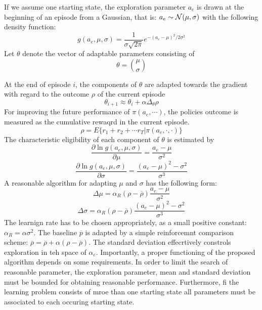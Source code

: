 \documentclass[10.5pt]{article}
\begin{document}
If we assume one starting state, the exploration parameter $a_e$ is drawn at the beginning of an episode from a Gaussian, that is: $a_e\sim {\cal N}(\mu, \sigma)$ with the following density function: 
\begin{equation}
g(a_e, \mu, \sigma) = \dfrac{1}{\sigma\sqrt{2\pi}}e^{-(a_e-\mu)^2/2\sigma^2}
\end{equation}
Let $\theta$ denote the vector of adaptable parameters consisting of
\begin{equation}
\theta = {\mu \choose \sigma}
\end{equation}

At the end of episode $i$, the components of $\theta$ are adapted towards the gradient with regard to the outcome $\rho$ of the current episode 
\begin{equation}
\theta_{i+1} \approx \theta_i +\alpha \Delta_\theta \rho
\end{equation}
For improving the future performance of $\pi(a_e, \cdots)$, the policies outcome is measured as the cumulative rewaqrd in the current episode. 
\begin{equation}
\rho = E\{r_1+r_2 + \cdots r_T|\pi (a_e, \cdot, \cdot)\}
\end{equation}
The characteristic eligibility of each component of $\theta$ is estimated by
\begin{equation}
\dfrac{\partial \ln g(a_e, \mu, \sigma)}{\partial \mu} = \dfrac{a_e-\mu}{\sigma^2}
\end{equation}
\begin{equation}
\dfrac{\partial \ln g(a_e, \mu, \sigma)}{\partial \sigma} = \dfrac{(a_e-\mu)^2-\sigma^2}{\sigma^3}
\end{equation}
A reasonable algorithm for adapting $\mu$ and $\sigma$ has the following form:
\begin{equation}
\Delta \mu = \alpha_R(\rho - \overline{\rho})\dfrac{a_e-\mu}{\sigma^2}
\end{equation}
\begin{equation}
\Delta \sigma = \alpha_R(\rho - \overline{\rho})\dfrac{(a_e-\mu)^2-\sigma^2}{\sigma^3}
\end{equation}
The learnign rate has to be chosen appropriately, as a small positive constant: $\alpha_R = \alpha\sigma^2$. The baseline $\overline{p}$ is adapted by a simple reinforcemnt comparison scheme: $\overline{\rho} = \overline{\rho} +\alpha(\rho - \overline{\rho})$. The standard deviation effecrtively constrols exploration in teh space of $\alpha_e$. Importantly, a proper functioning of the proposed algorithm depends on some requirements. In order to limit the search of reasonable parameter, the exploration parameter, mean and standard deviation must be bounded for obtaining reasonable performance. Furthermore, fi the learning problem consists of mroe than one starting state all parameters must be associated to each occuring starting state. \\
\end{document}
